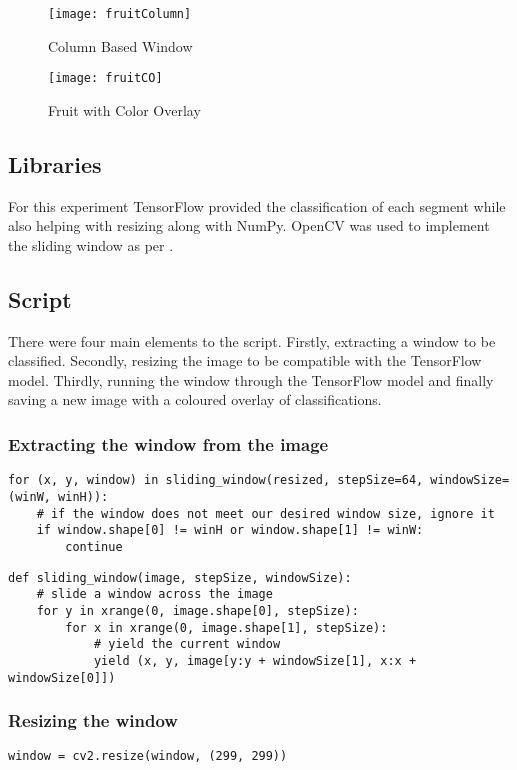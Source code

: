 \begin{figure}
\centering
    \texttt{[image: fruitColumn]}
    \caption{Column Based Window}
    \label{fig:fruitColumn}
\end{figure}

\begin{figure}
\centering
    \texttt{[image: fruitCO]}
    \caption{Fruit with Color Overlay}
    \label{fig:fruitOverlay}
\end{figure}

\subsection*{Libraries}
For this experiment TensorFlow provided the classification of each segment while
also helping with resizing along with NumPy. OpenCV was used to implement the
sliding window as per \parencite{slidingWindowTut}.

\subsection*{Script}
There were four main elements to the script. Firstly, extracting a window to be
classified. Secondly, resizing the image to be compatible with the TensorFlow model. Thirdly, running the window through the TensorFlow model and finally
saving a new image with a coloured overlay of classifications.

\subsubsection*{Extracting the window from the image}
\begin{lstlisting}[style=Python]
for (x, y, window) in sliding_window(resized, stepSize=64, windowSize=(winW, winH)):
	# if the window does not meet our desired window size, ignore it
	if window.shape[0] != winH or window.shape[1] != winW:
		continue
\end{lstlisting}


\begin{lstlisting}[style=Python]
def sliding_window(image, stepSize, windowSize):
	# slide a window across the image
	for y in xrange(0, image.shape[0], stepSize):
		for x in xrange(0, image.shape[1], stepSize):
			# yield the current window
			yield (x, y, image[y:y + windowSize[1], x:x + windowSize[0]])
\end{lstlisting}

\subsubsection*{Resizing the window}
\begin{lstlisting}[style=Python]
window = cv2.resize(window, (299, 299))
\end{lstlisting}

